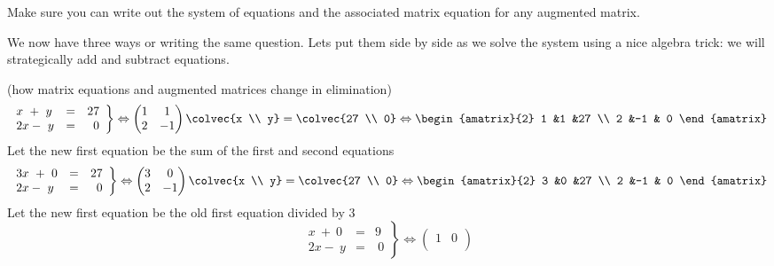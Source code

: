 Make sure you can write out the system of equations and the associated matrix equation for any augmented matrix. 




We now have three ways or writing the same question. 
Lets put them side by side as we solve the system using a nice algebra trick: we will strategically add and subtract equations.

\begin{example}  (how matrix equations and augmented matrices change in elimination)
\[
   \left.
\begin{array}{lcr}
	x\ +\ y & = & 27 \\
	2x-\ y & = &\  0 
     \end{array}
   \right\} 
   \Leftrightarrow
    \begin{pmatrix}
      1             &1  \\
      2             &-1
    \end{pmatrix}
  \colvec{x \\ y}
  =
  \colvec{27 \\ 0}
  \Leftrightarrow
 \begin{amatrix}{2}
1 &1 &27 \\ 2 &-1 & 0
\end{amatrix}
\]
Let the new first equation be the sum of the first and second equations
\[
   \left.
\begin{array}{lcr}
	3x\ +\ 0 & = & 27 \\
	2x-\ y & = &\  0 
     \end{array}
   \right\} 
   \Leftrightarrow
    \begin{pmatrix}
      3             &0  \\
      2             &-1
    \end{pmatrix}
  \colvec{x \\ y}
  =
  \colvec{27 \\ 0}
  \Leftrightarrow
 \begin{amatrix}{2}
3 &0 &27 \\ 2 &-1 & 0
\end{amatrix}
\]
Let the new first equation be the old first equation divided by 3
\[
   \left.
\begin{array}{lcr}
	x\ +\ 0 & = & 9 \\
	2x-\ y & = &\  0 
     \end{array}
   \right\} 
   \Leftrightarrow
    \begin{pmatrix}
      1             &0  \\

\end{pmatrix}\]
\end{example}
